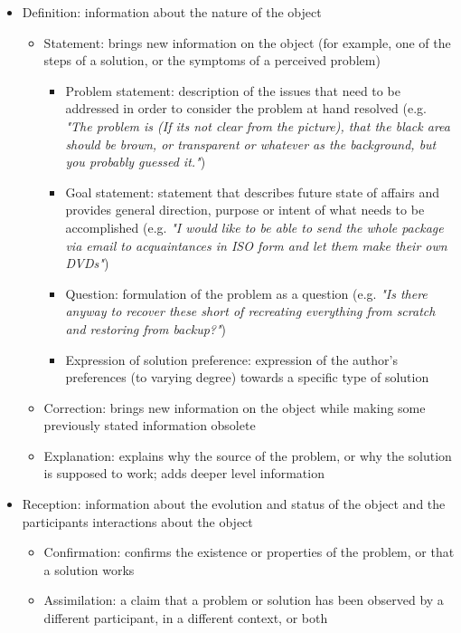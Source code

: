 \documentclass[11pt]{article}
\begin{document}
\begin{itemize}
	\item Definition: information about the nature of the object
		\begin{itemize}
			\item Statement: brings new information on the object (for example, one of the steps of a solution, or the symptoms of a perceived problem)
					\begin{itemize}
						\item Problem statement: description of the issues that need to be addressed in order to consider the problem at hand resolved (e.g. \textit{"The problem is (If its not clear from the picture), that the black area should be brown, or transparent or whatever as the background, but you probably guessed it."})
						\item Goal statement: statement that describes future state of affairs and provides general direction, purpose or intent of what needs to be accomplished (e.g. \textit{"I would like to be able to send the whole package via email to acquaintances in ISO form and let them make their own DVDs"})
						\item Question: formulation of the problem as a question (e.g. \textit{"Is there anyway to recover these short of recreating everything from scratch and restoring from backup?"})
						\item Expression of solution preference: expression of the author's preferences (to varying degree) towards a specific type of solution
					\end{itemize}
			\item Correction: brings new information on the object while making some previously stated information obsolete
			\item Explanation: explains why the source of the problem, or why the solution is supposed to work; adds deeper level information
		\end{itemize}
	\item Reception: information about the evolution and status of the object and the participants interactions about the object
		\begin{itemize}
			\item Confirmation: confirms the existence or properties of the problem, or that a solution works
			\item Assimilation: a claim that a problem or solution has been observed by a different participant, in a different context, or both
				\begin{itemize}	

\end{itemize}
\end{itemize}
\end{itemize}
\end{document}
